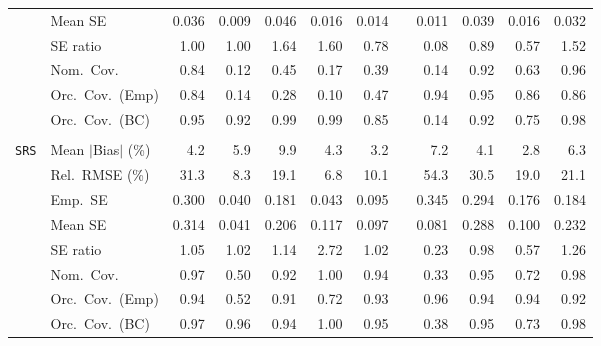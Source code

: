 \begin{landscape}
\begin{longtable}{llrrrrrrrrrr}
 & Mean SE & 0.036 & 0.009 & 0.046 & 0.016 & 0.014 &  & 0.011 & 0.039 & 0.016 & 0.032 \\
 & SE ratio & \cellcolor{rankone}1.00 & \cellcolor{rankone}1.00 & 1.64 & 1.60 & \cellcolor{rankthree}0.78 &  & 0.08 & \cellcolor{ranktwo}0.89 & 0.57 & 1.52 \\
 & Nom.\ Cov. & \cellcolor{rankthree}0.84 & 0.12 & 0.45 & 0.17 & 0.39 &  & 0.14 & \cellcolor{ranktwo}0.92 & 0.63 & \cellcolor{rankone}0.96 \\
 & Orc.\ Cov.\ (Emp) & 0.84 & 0.14 & 0.28 & 0.10 & 0.47 &  & \cellcolor{ranktwo}0.94 & \cellcolor{rankone}0.95 & \cellcolor{rankthree}0.86 & \cellcolor{rankthree}0.86 \\
 & Orc.\ Cov.\ (BC) & \cellcolor{rankone}0.95 & \cellcolor{ranktwo}0.92 & \cellcolor{rankthree}0.99 & \cellcolor{rankthree}0.99 & 0.85 &  & 0.14 & \cellcolor{ranktwo}0.92 & 0.75 & \cellcolor{ranktwo}0.98 \\
\addlinespace[2pt]
\multicolumn{12}{l}{\textbf{Binary \& Categorical Phase-Two Covariates}} \\
\addlinespace[2pt]
\quad \texttt{SRS} & Mean $|$Bias$|$ (\%) & 4.2 & 5.9 & 9.9 & 4.3 & \cellcolor{ranktwo}3.2 &  & 7.2 & \cellcolor{rankthree}4.1 & \cellcolor{rankone}2.8 & 6.3 \\
 & Rel.\ RMSE (\%) & 31.3 & \cellcolor{ranktwo}8.3 & 19.1 & \cellcolor{rankone}6.8 & \cellcolor{rankthree}10.1 &  & 54.3 & 30.5 & 19.0 & 21.1 \\
 & Emp.\ SE & 0.300 & 0.040 & 0.181 & 0.043 & 0.095 &  & 0.345 & 0.294 & 0.176 & 0.184 \\
 & Mean SE & 0.314 & 0.041 & 0.206 & 0.117 & 0.097 &  & 0.081 & 0.288 & 0.100 & 0.232 \\
 & SE ratio & \cellcolor{ranktwo}1.05 & \cellcolor{rankone}1.02 & \cellcolor{rankthree}1.14 & 2.72 & \cellcolor{rankone}1.02 &  & 0.23 & \cellcolor{rankone}0.98 & 0.57 & 1.26 \\
 & Nom.\ Cov. & \cellcolor{rankthree}0.97 & 0.50 & 0.92 & 1.00 & \cellcolor{ranktwo}0.94 &  & 0.33 & \cellcolor{rankone}0.95 & 0.72 & 0.98 \\
 & Orc.\ Cov.\ (Emp) & \cellcolor{rankone}0.94 & 0.52 & 0.91 & 0.72 & \cellcolor{ranktwo}0.93 &  & \cellcolor{rankone}0.96 & \cellcolor{rankone}0.94 & \cellcolor{rankone}0.94 & \cellcolor{rankthree}0.92 \\
 & Orc.\ Cov.\ (BC) & \cellcolor{rankthree}0.97 & \cellcolor{ranktwo}0.96 & \cellcolor{ranktwo}0.94 & 1.00 & \cellcolor{rankone}0.95 &  & 0.38 & \cellcolor{rankone}0.95 & 0.73 & 0.98 \\

\end{longtable}
\end{landscape}
